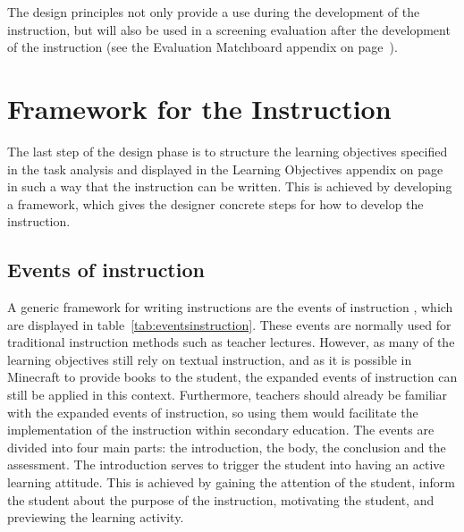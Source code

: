 \documentclass[11pt,twoside]{report} %
\begin{document}
The design principles not only provide a use during the development of the instruction, but will also be used in a screening evaluation after the development of the instruction \cite{evamatchboard} (see the Evaluation Matchboard appendix on page~\pageref{app:evamatchboard}).

\chapter{Framework for the Instruction}

The last step of the design phase is to structure the learning objectives specified in the task analysis and displayed in the Learning Objectives appendix on page~\pageref{app:learningobjectives} in such a way that the instruction can be written. This is achieved by developing a framework, which gives the designer concrete steps for how to develop the instruction.

\section{Events of instruction}

A generic framework for writing instructions are the events of instruction \cite{smithragan}, which are displayed in table~\ref{tab:eventsinstruction}. These events are normally used for traditional instruction methods such as teacher lectures. However, as many of the learning objectives still rely on textual instruction, and as it is possible in Minecraft to provide books to the student, the expanded events of instruction can still be applied in this context. Furthermore, teachers should already be familiar with the expanded events of instruction, so using them would facilitate the implementation of the instruction within secondary education. The events are divided into four main parts: the introduction, the body, the conclusion and the assessment. The introduction serves to trigger the student into having an active learning attitude. This is achieved by gaining the attention of the student, inform the student about the purpose of the instruction, motivating the student, and previewing the learning activity.
\end{document}
